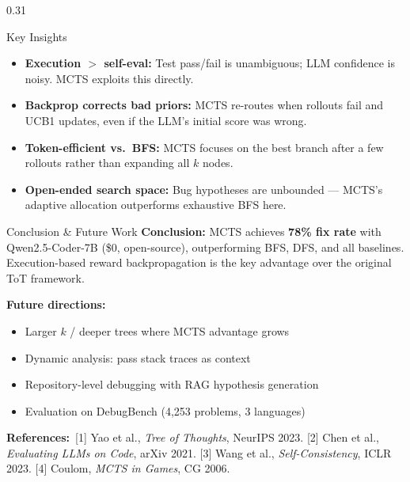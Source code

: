 \documentclass[final]{beamer}
\begin{document}
\begin{frame}[t]{}
\begin{columns}[t,totalwidth=\textwidth]
\begin{column}{0.31\textwidth}
\begin{block}{Key Insights}
\begin{itemize}
\setlength{\itemsep}{3pt}
  \item \textbf{Execution $>$ self-eval:} Test pass/fail is unambiguous; LLM confidence is noisy. MCTS exploits this directly.
  \item \textbf{Backprop corrects bad priors:} MCTS re-routes when rollouts fail and UCB1 updates, even if the LLM's initial score was wrong.
  \item \textbf{Token-efficient vs.\ BFS:} MCTS focuses on the best branch after a few rollouts rather than expanding all $k$ nodes.
  \item \textbf{Open-ended search space:} Bug hypotheses are unbounded --- MCTS's adaptive allocation outperforms exhaustive BFS here.
\end{itemize}
\end{block}

\vspace{0.6cm}

\begin{block}{Conclusion \& Future Work}
\textbf{Conclusion:} MCTS achieves \textbf{78\% fix rate} with Qwen2.5-Coder-7B (\$0, open-source), outperforming BFS, DFS, and all baselines. Execution-based reward backpropagation is the key advantage over the original ToT framework.
\vspace{0.4cm}

\textbf{Future directions:}
\begin{itemize}
\setlength{\itemsep}{2pt}
  \item Larger $k$ / deeper trees where MCTS advantage grows
  \item Dynamic analysis: pass stack traces as context
  \item Repository-level debugging with RAG hypothesis generation
  \item Evaluation on DebugBench (4,253 problems, 3 languages)
\end{itemize}
\vspace{0.4cm}

\textbf{References:}\,
\small
[1] Yao et al., \textit{Tree of Thoughts}, NeurIPS 2023.
[2] Chen et al., \textit{Evaluating LLMs on Code}, arXiv 2021.
[3] Wang et al., \textit{Self-Consistency}, ICLR 2023.
[4] Coulom, \textit{MCTS in Games}, CG 2006.
\end{block}

\end{column}
\end{columns}

\end{frame}
\end{document}

